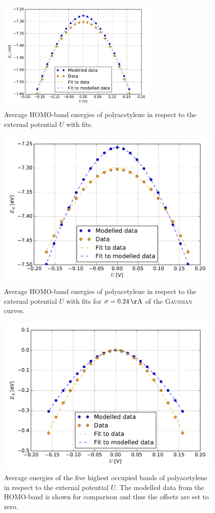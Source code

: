 \begin{figure}
	\centering
	\includegraphics[width = 0.7\textwidth]{Images/polyacetylene/charging/Homo_energy_charge}
	\caption{Average HOMO-band energies of polyacetylene in respect to the external potential $U$ with fits.}
	\label{image_HOMO_average_polyacetylene}
\end{figure}
\begin{figure}
	\centering
	\includegraphics[width = .7\textwidth]{Images/polyacetylene/charging/Homo_energy_charge_smaller_sigma}
	\caption{Average HOMO-band energies of polyacetylene in respect to the external potential $U$ with fits for $\sigma = \unit[0.24]{\AA}$ of the \textsc{Gaussian} curves.}
	\label{image_HOMO_average_polyacetylene_smaller_sigma}
\end{figure}
\begin{figure}
	\centering
	\includegraphics[width = .7\textwidth]{Images/polyacetylene/charging/Band_energy_average_charge}
	\caption{Average energies of the five highest occupied bands of polyacetylene in respect to the external potential $U$. The modelled data from the HOMO-band is shown for comparison and thus the offsets are set to zero.}
	\label{image_all_average_polyacetylene}
\end{figure}
